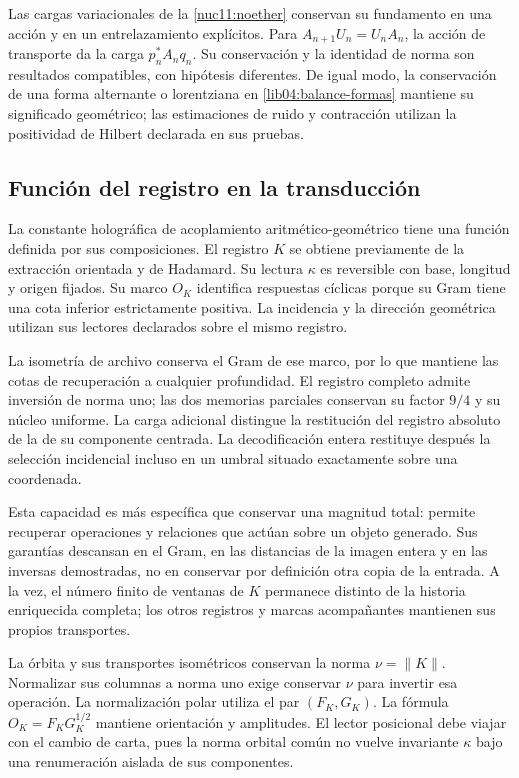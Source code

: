 Las cargas variacionales de la \cref{nuc11:noether} conservan su
fundamento en una acción y en un entrelazamiento explícitos. Para
\(A_{n+1}U_n=U_nA_n\), la acción de transporte da la carga
\(p_n^*A_nq_n\). Su conservación y la identidad de norma son
resultados compatibles, con hipótesis diferentes. De igual modo,
la conservación de una forma alternante o lorentziana en
\eqref{lib04:balance-formas} mantiene su significado geométrico;
las estimaciones de ruido y contracción utilizan la positividad
de Hilbert declarada en sus pruebas.

\subsection{Función del registro en la transducción}
\label{lib06:registro}

La constante holográfica de acoplamiento aritmético-geométrico tiene
una función definida por sus composiciones. El registro \(K\)
se obtiene previamente de la extracción orientada y de Hadamard.
Su lectura \(\kappa\) es reversible con base, longitud y origen
fijados. Su marco \(O_K\) identifica respuestas cíclicas porque
su Gram tiene una cota inferior estrictamente positiva. La
incidencia y la dirección geométrica utilizan sus lectores
declarados sobre el mismo registro.

La isometría de archivo conserva el Gram de ese marco, por lo que
mantiene las cotas de recuperación a cualquier profundidad. El
registro completo admite inversión de norma uno; las dos memorias
parciales conservan su factor \(9/4\) y su núcleo uniforme. La
carga adicional distingue la restitución del registro absoluto de
la de su componente centrada. La decodificación entera restituye
después la selección incidencial incluso en un umbral situado
exactamente sobre una coordenada.

Esta capacidad es más específica que conservar una magnitud total:
permite recuperar operaciones y relaciones que actúan sobre un
objeto generado. Sus garantías descansan en el Gram, en las
distancias de la imagen entera y en las inversas demostradas, no
en conservar por definición otra copia de la entrada. A la vez,
el número finito de ventanas de \(K\) permanece distinto de la
historia enriquecida completa; los otros registros y marcas
acompañantes mantienen sus propios transportes.

La órbita y sus transportes isométricos conservan la norma
\(\nu=\|K\|\). Normalizar sus columnas a norma uno exige
conservar \(\nu\) para invertir esa operación. La normalización
polar utiliza el par
\((F_K,G_K)\). La fórmula
\(O_K=F_KG_K^{1/2}\) mantiene orientación y amplitudes.
El lector posicional debe viajar con el cambio de carta, pues la
norma orbital común no vuelve invariante \(\kappa\) bajo una
renumeración aislada de sus componentes.

